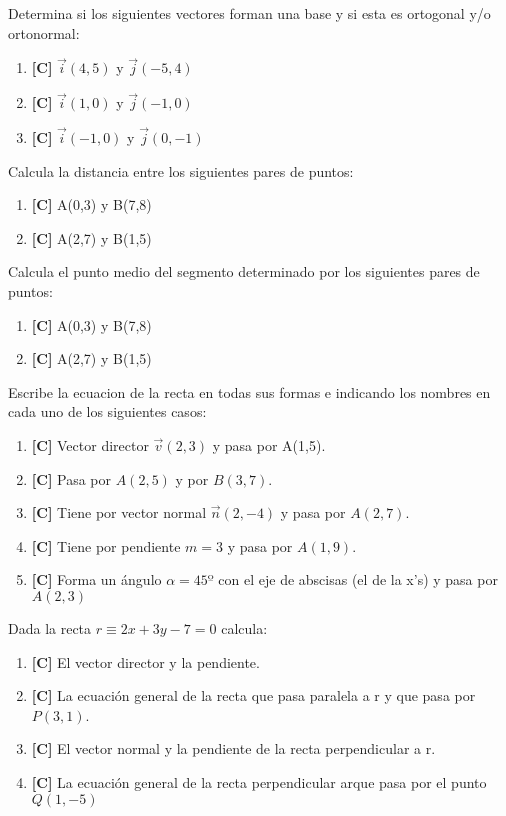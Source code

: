 \Exercicio Determina si los siguientes vectores forman una base y si esta es ortogonal y/o ortonormal:

\begin{enumerate}[topsep=0pt]
	\item \textbf{[C]} $ \vec{i}(4,5)$ y $\vec{j}(-5,4) $
	\item \textbf{[C]} $ \vec{i}(1,0)$ y $\vec{j}(-1,0) $
	\item \textbf{[C]} $ \vec{i}(-1,0)$ y $\vec{j}(0,-1) $
\end{enumerate}


\Exercicio Calcula la distancia entre los siguientes pares de puntos:

\begin{enumerate}[topsep=0pt]
	\item \textbf{[C]} A(0,3) y B(7,8)
	\item \textbf{[C]} A(2,7) y B(1,5)
\end{enumerate}


\Exercicio Calcula el punto medio del segmento determinado por los siguientes pares de puntos:

\begin{enumerate}[topsep=0pt]
	\item \textbf{[C]} A(0,3) y B(7,8)
	\item \textbf{[C]} A(2,7) y B(1,5)
\end{enumerate}


\Exercicio Escribe la ecuacion de la recta en todas sus formas e indicando los nombres en cada uno de los siguientes casos:

\begin{enumerate}[topsep=0pt]
	\item \textbf{[C]} Vector director $\vec{v}(2,3)$ y pasa por A(1,5).
	\item \textbf{[C]} Pasa por $A(2,5)$ y por $B(3,7)$.
	\item \textbf{[C]} Tiene por vector normal $\vec{n}(2,-4)$ y pasa por $A(2,7)$.
	\item \textbf{[C]} Tiene por pendiente $m=3$ y pasa por $A(1,9)$.
	\item \textbf{[C]} Forma un ángulo $\alpha=45º$ con el eje de abscisas (el de la x's) y pasa por $A(2,3)$
\end{enumerate}


\Exercicio Dada la recta $r \equiv 2x + 3y -7 = 0$ calcula:

\begin{enumerate}[topsep=0pt]
	\item \textbf{[C]} El vector director y la pendiente.
	\item \textbf{[C]} La ecuación general de la recta que pasa paralela a r y que pasa por $P(3,1)$.
	\item \textbf{[C]} El vector normal y la pendiente de la recta perpendicular a r.
	\item \textbf{[C]} La ecuación general de la recta perpendicular arque pasa por el punto $Q(1,-5)$
\end{enumerate}



